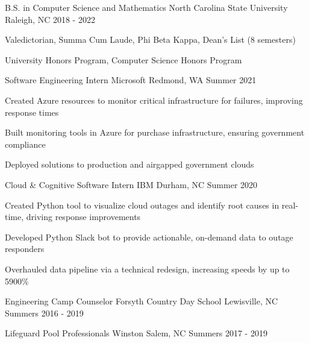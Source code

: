 \documentclass[a4paper]{awesome-cv}
\begin{document}
	
	\makecvheader[C]
	
	
	\begin{cventries}
		\cventry
		{B.S. in Computer Science and Mathematics}	%
		{North Carolina State University} 			%
		{Raleigh, NC} 								%
		{2018 - 2022} 					%
		{
			\begin{cvitems}
				\item {Valedictorian, Summa Cum Laude, Phi Beta Kappa, Dean's List (8 semesters)}
				\item {University Honors Program, Computer Science Honors Program}
			\end{cvitems}
		}
	\end{cventries}

	\cvsection{Experience}
	\begin{cventries}
		\cventry
		{Software Engineering Intern} %
		{Microsoft} %
		{Redmond, WA} %
		{Summer 2021} %
		{
			\begin{cvitems} %
				\item {Created Azure resources to monitor critical infrastructure for failures, improving response times}
				\item {Built monitoring tools in Azure for purchase infrastructure, ensuring government compliance}
				\item {Deployed solutions to production and airgapped government clouds}
			\end{cvitems}
		}
	
		\cventry
		{Cloud \& Cognitive Software Intern} %
		{IBM} %
		{Durham, NC} %
		{Summer 2020} %
		{
			\begin{cvitems} %
				\item {Created Python tool to visualize cloud outages and identify root causes in real-time, driving response improvements}
				\item {Developed Python Slack bot to provide actionable, on-demand data to outage responders}
				\item {Overhauled data pipeline via a technical redesign, increasing speeds by up to 5900\%}
			\end{cvitems}
		}
	
		\cventry
		{Engineering Camp Counselor} %
		{Forsyth Country Day School} %
		{Lewisville, NC} %
		{Summers 2016 - 2019} %
		{}
		
		\cventry
		{Lifeguard} %
		{Pool Professionals} %
		{Winston Salem, NC} %
		{Summers 2017 - 2019} %
		{}
	\end{cventries}
	
\end{document}
